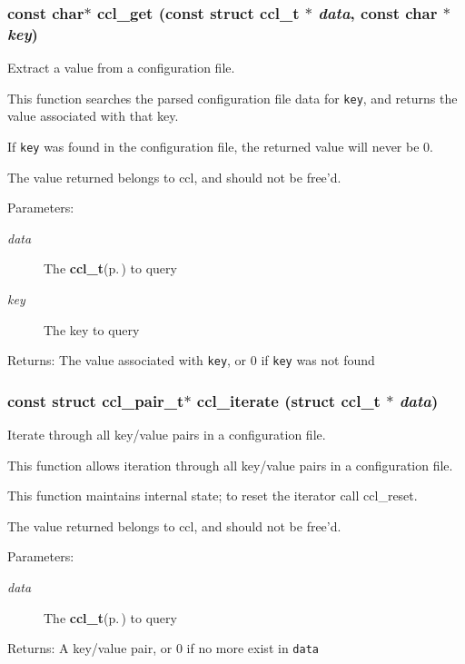 \subsubsection{\setlength{\rightskip}{0pt plus 5cm}const char$\ast$ ccl\_\-get (const struct {\bf ccl\_\-t} $\ast$ {\em data}, const char $\ast$ {\em key})}\label{ccl_8h_a3}


Extract a value from a configuration file. 

This function searches the parsed configuration file data for {\tt key}, and returns the value associated with that key.\par
 If {\tt key} was found in the configuration file, the returned value will never be 0.\par
 The value returned belongs to ccl, and should not be free'd. \begin{Desc}
\item[Parameters:]
\begin{description}
\item[{\em data}]The {\bf ccl\_\-t}{\rm (p.\,\pageref{structccl__t})} to query \item[{\em key}]The key to query \end{description}
\end{Desc}
\begin{Desc}
\item[Returns:]The value associated with {\tt key}, or 0 if {\tt key} was not found \end{Desc}
\subsubsection{\setlength{\rightskip}{0pt plus 5cm}const struct {\bf ccl\_\-pair\_\-t}$\ast$ ccl\_\-iterate (struct {\bf ccl\_\-t} $\ast$ {\em data})}\label{ccl_8h_a4}


Iterate through all key/value pairs in a configuration file. 

This function allows iteration through all key/value pairs in a configuration file.\par
 This function maintains internal state; to reset the iterator call ccl\_\-reset.\par
 The value returned belongs to ccl, and should not be free'd.\par
 \begin{Desc}
\item[Parameters:]
\begin{description}
\item[{\em data}]The {\bf ccl\_\-t}{\rm (p.\,\pageref{structccl__t})} to query \end{description}
\end{Desc}
\begin{Desc}
\item[Returns:]A key/value pair, or 0 if no more exist in {\tt data} \end{Desc}
